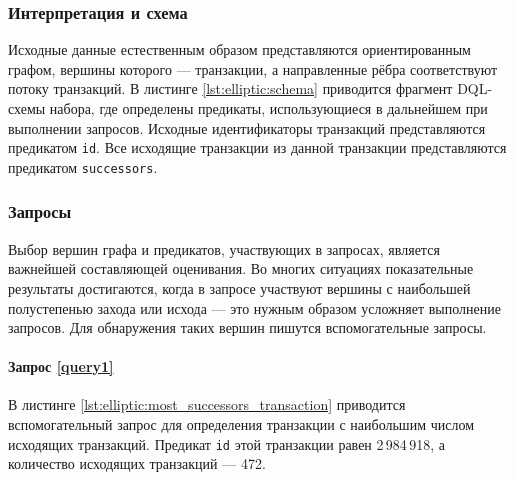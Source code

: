 \subsubsection{Интерпретация и схема}

Исходные данные естественным образом представляются ориентированным графом, вершины которого --- транзакции, а
направленные рёбра соответствуют потоку транзакций. В листинге \ref{lst:elliptic:schema} приводится фрагмент DQL-схемы
набора, где определены предикаты, использующиеся в дальнейшем при выполнении запросов. Исходные идентификаторы
транзакций представляются предикатом \texttt{id}. Все исходящие транзакции из данной транзакции представляются
предикатом \texttt{successors}.

\subsubsection{Запросы}

Выбор вершин графа и предикатов, участвующих в запросах, является важнейшей составляющей оценивания. Во многих
ситуациях показательные результаты достигаются, когда в запросе участвуют вершины с наибольшей полустепенью захода или
исхода --- это нужным образом усложняет выполнение запросов. Для обнаружения таких вершин пишутся вспомогательные
запросы.

\paragraph{Запрос \ref{query1}}

В листинге \ref{lst:elliptic:most_successors_transaction} приводится вспомогательный запрос для определения транзакции
с наибольшим числом исходящих транзакций. Предикат \texttt{id} этой транзакции равен 2\,984\,918, а количество
исходящих транзакций --- 472.


